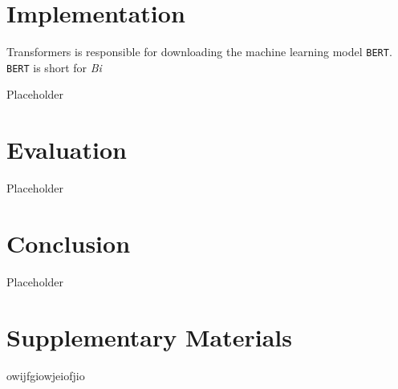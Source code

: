                 
\pagebreak
    \section{Implementation}
    \label{sec:implementation}
            
            Transformers is responsible for downloading the machine learning model \texttt{BERT}.
            \texttt{BERT} is short for \emph{Bi}


        Placeholder

    \section{Evaluation}
    \label{sec:evaluation}

        Placeholder

    \section{Conclusion}
    \label{sec:conclusion}

        Placeholder

    \section{Supplementary Materials}
    \label{sec:supplementary-materials}

        owijfgiowjeiofjio


    \pagebreak

    
    


